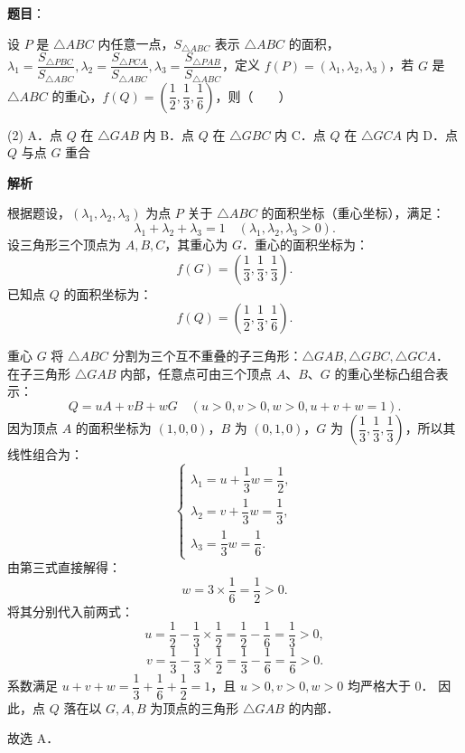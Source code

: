 \begin{answer}

\textbf{题目}：

设 $P$ 是 $\triangle ABC$ 内任意一点，$S_{\triangle ABC}$ 表示 $\triangle ABC$ 的面积，$\lambda_1 = \dfrac{S_{\triangle PBC}}{S_{\triangle ABC}}, \lambda_2 = \dfrac{S_{\triangle PCA}}{S_{\triangle ABC}}, \lambda_3 = \dfrac{S_{\triangle PAB}}{S_{\triangle ABC}}$，定义 $f(P) = (\lambda_1, \lambda_2, \lambda_3)$，若 $G$ 是 $\triangle ABC$ 的重心，$f(Q) = \left(\dfrac{1}{2}, \dfrac{1}{3}, \dfrac{1}{6}\right)$，则\mbox{（　　）}

\begin{gkopts}(2)
\task A．点 $Q$ 在 $\triangle GAB$ 内
\task B．点 $Q$ 在 $\triangle GBC$ 内
\task C．点 $Q$ 在 $\triangle GCA$ 内
\task D．点 $Q$ 与点 $G$ 重合
\end{gkopts}

\textbf{解析}

根据题设，$(\lambda_1, \lambda_2, \lambda_3)$ 为点 $P$ 关于 $\triangle ABC$ 的面积坐标（重心坐标），满足：
\nopagebreak[4]
\[
\lambda_1 + \lambda_2 + \lambda_3 = 1 \quad (\lambda_1, \lambda_2, \lambda_3 > 0).
\]
设三角形三个顶点为 $A, B, C$，其重心为 $G$．重心的面积坐标为：
\nopagebreak[4]
\[
f(G) = \left(\frac{1}{3}, \frac{1}{3}, \frac{1}{3}\right).
\]
已知点 $Q$ 的面积坐标为：
\nopagebreak[4]
\[
f(Q) = \left(\frac{1}{2}, \frac{1}{3}, \frac{1}{6}\right).
\]

重心 $G$ 将 $\triangle ABC$ 分割为三个互不重叠的子三角形：$\triangle GAB, \triangle GBC, \triangle GCA$．
在子三角形 $\triangle GAB$ 内部，任意点可由三个顶点 $A$、$B$、$G$ 的重心坐标凸组合表示：
\nopagebreak[4]
\[
Q = u A + v B + w G \quad (u > 0, v > 0, w > 0, u + v + w = 1).
\]
因为顶点 $A$ 的面积坐标为 $(1, 0, 0)$，$B$ 为 $(0, 1, 0)$，$G$ 为 $\left(\dfrac{1}{3}, \dfrac{1}{3}, \dfrac{1}{3}\right)$，所以其线性组合为：
\nopagebreak[4]
\[
\begin{cases}
\lambda_1 = u + \dfrac{1}{3}w = \dfrac{1}{2}, \\
\lambda_2 = v + \dfrac{1}{3}w = \dfrac{1}{3}, \\
\lambda_3 = \dfrac{1}{3}w = \dfrac{1}{6}.
\end{cases}
\]
由第三式直接解得：
\nopagebreak[4]
\[
w = 3 \times \frac{1}{6} = \frac{1}{2} > 0.
\]
将其分别代入前两式：
\nopagebreak[4]
\[
u = \frac{1}{2} - \frac{1}{3} \times \frac{1}{2} = \frac{1}{2} - \frac{1}{6} = \frac{1}{3} > 0,
\]
\nopagebreak[4]
\[
v = \frac{1}{3} - \frac{1}{3} \times \frac{1}{2} = \frac{1}{3} - \frac{1}{6} = \frac{1}{6} > 0.
\]
系数满足 $u + v + w = \dfrac{1}{3} + \dfrac{1}{6} + \dfrac{1}{2} = 1$，且 $u > 0, v > 0, w > 0$ 均严格大于 0．
因此，点 $Q$ 落在以 $G, A, B$ 为顶点的三角形 $\triangle GAB$ 的内部．

故选 A．


\end{answer}
